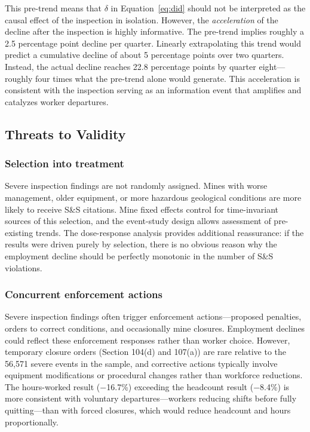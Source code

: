 \documentclass[12pt]{article}
\begin{document}
This pre-trend means that $\delta$ in Equation~\eqref{eq:did} should not be interpreted as the causal effect of the inspection in isolation. However, the \textit{acceleration} of the decline after the inspection is highly informative. The pre-trend implies roughly a 2.5 percentage point decline per quarter. Linearly extrapolating this trend would predict a cumulative decline of about 5 percentage points over two quarters. Instead, the actual decline reaches 22.8 percentage points by quarter eight---roughly four times what the pre-trend alone would generate. This acceleration is consistent with the inspection serving as an information event that amplifies and catalyzes worker departures.

\subsection{Threats to Validity}

\subsubsection*{Selection into treatment} Severe inspection findings are not randomly assigned. Mines with worse management, older equipment, or more hazardous geological conditions are more likely to receive S\&S citations. Mine fixed effects control for time-invariant sources of this selection, and the event-study design allows assessment of pre-existing trends. The dose-response analysis provides additional reassurance: if the results were driven purely by selection, there is no obvious reason why the employment decline should be perfectly monotonic in the number of S\&S violations.

\subsubsection*{Concurrent enforcement actions} Severe inspection findings often trigger enforcement actions---proposed penalties, orders to correct conditions, and occasionally mine closures. Employment declines could reflect these enforcement responses rather than worker choice. However, temporary closure orders (Section 104(d) and 107(a)) are rare relative to the 56,571 severe events in the sample, and corrective actions typically involve equipment modifications or procedural changes rather than workforce reductions. The hours-worked result ($-$16.7\%) exceeding the headcount result ($-$8.4\%) is more consistent with voluntary departures---workers reducing shifts before fully quitting---than with forced closures, which would reduce headcount and hours proportionally.
\end{document}
